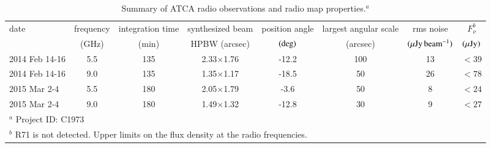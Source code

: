 \documentclass[structabstract]{aa}
\begin{document}
\begin{table*}
  \begin{center}
    \caption{Summary of ATCA radio observations and radio map properties.$^a$}
    \begin{tabular}{lccccccc}
      \hline
      \hline
      date & frequency & integration time & synthesized beam  & position angle & largest angular scale & rms noise & $F_{\nu}^b$ \\
      \small
      & (GHz) & (min) & HPBW (arcsec) & $(\rm deg)$ & (arcsec) &$(\rm \mu Jy\, beam^{-1})$ & $\rm (\mu Jy)$\\
      \hline
      2014 Feb 14-16& 5.5 & 135 &2.33$\times$1.76 & -12.2 & 100 & 13 & $<39$\\
      2014 Feb 14-16& 9.0  & 135 &1.35$\times$1.17 & -18.5 & 50& 26 & $<78$\\
      2015 Mar 2-4& 5.5 & 180 &2.05$\times$1.79 & -3.6 & 50& 8 & $<24$\\
      2015 Mar 2-4& 9.0 & 180 &1.49$\times$1.32  & -12.8 &30 & 9 & $<27$\\
\hline
\multicolumn{8}{l}{$^a$ Project ID: C1973} \\
\multicolumn{8}{l}{$^b$ R71 is not detected. Upper limits on the flux density at the radio frequencies. } \\
    \end{tabular}
    \label{tab:ATCA}
    \\
  \end{center}
\end{table*}
\end{document}

